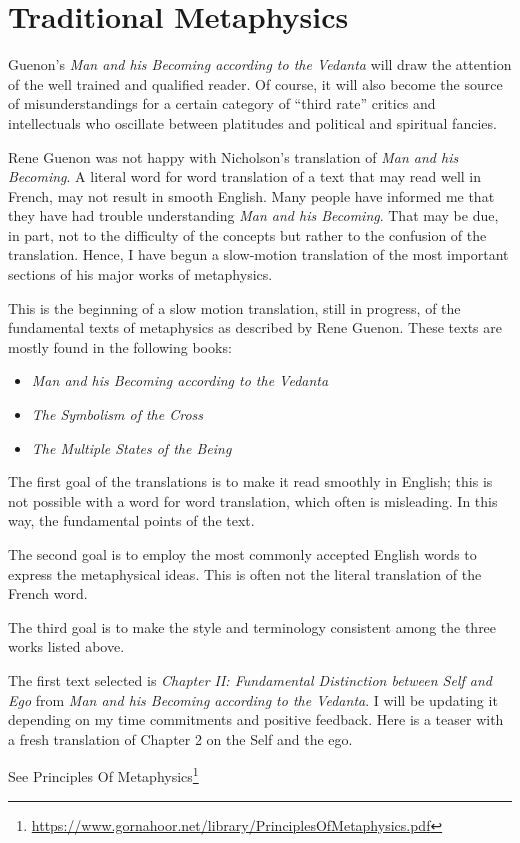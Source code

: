 \section{Traditional Metaphysics}

\begin{quotex}
Guenon's \emph{Man and his Becoming according to the Vedanta} will draw the attention of the well trained and qualified reader. Of course, it will also become the source of misunderstandings for a certain category of ``third rate'' critics and intellectuals who oscillate between platitudes and political and spiritual fancies.
\end{quotex}


Rene Guenon was not happy with Nicholson's translation of \emph{Man and his Becoming}. A literal word for word translation of a text that may read well in French, may not result in smooth English. Many people have informed me that they have had trouble understanding \emph{Man and his Becoming}. That may be due, in part, not to the difficulty of the concepts but rather to the confusion of the translation. Hence, I have begun a slow-motion translation of the most important sections of his major works of metaphysics.

This is the beginning of a slow motion translation, still in progress, of the fundamental texts of metaphysics as described by Rene Guenon. These texts are mostly found in the following books:

\begin{itemize}


\item \emph{Man and his Becoming according to the Vedanta}


\item \emph{The Symbolism of the Cross}


\item \emph{The Multiple States of the Being}

\end{itemize}


The first goal of the translations is to make it read smoothly in English; this is not possible with a word for word translation, which often is misleading. In this way, the fundamental points of the text.

The second goal is to employ the most commonly accepted English words to express the metaphysical ideas. This is often not the literal translation of the French word.

The third goal is to make the style and terminology consistent among the three works listed above.

The first text selected is \emph{Chapter II: Fundamental Distinction between Self and Ego} from \emph{Man and his Becoming according to the Vedanta}. I will be updating it depending on my time commitments and positive feedback. Here is a teaser with a fresh translation of Chapter 2 on the Self and the ego.

See Principles Of Metaphysics\footnote{\url{https://www.gornahoor.net/library/PrinciplesOfMetaphysics.pdf}}



